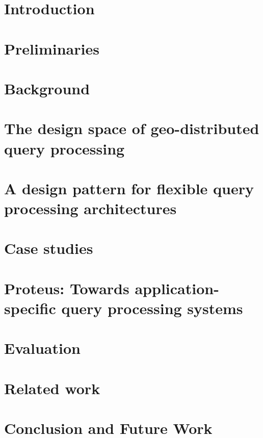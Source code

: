 \chapter{Introduction}
\label{ch:intro}


\chapter{Preliminaries}
\label{ch:models}


\chapter{Background}
\label{ch:background}


\chapter{The design space of geo-distributed query processing}
\label{ch:design_space}


\chapter{A design pattern for flexible query processing architectures}
\label{ch:design_pattern}


\chapter{Case studies}
\label{ch:case_studies}


% 

\chapter{Proteus: Towards application-specific query processing systems}
\label{ch:proteus}


\chapter{Evaluation}
\label{ch:evaluation}


\chapter{Related work}
\label{ch:related_work}


\chapter{Conclusion and Future Work}
\label{ch:conclusion}

